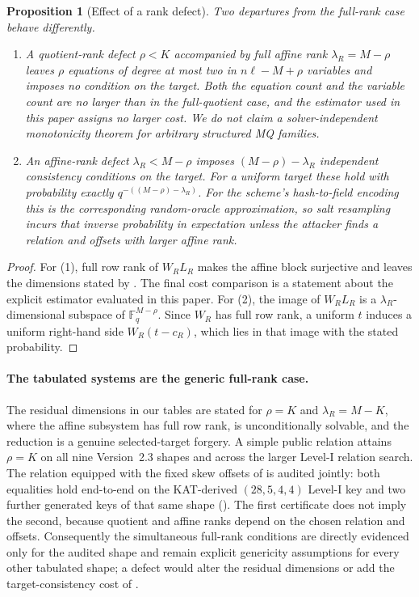 \documentclass[11pt]{article}
\newtheorem{proposition}[theorem]{Proposition}
\newcommand{\F}{\mathbb F}
\begin{document}
\begin{proposition}[Effect of a rank defect]
\label{prop:affine-rank}
Two departures from the full-rank case behave differently.
\begin{enumerate}
\item A \emph{quotient-rank} defect $\rho<K$ accompanied by full affine rank
$\lambda_R=M-\rho$ leaves $\rho$ equations of degree at most two in
$n\ell-M+\rho$ variables and imposes no condition on the target.  Both the
equation count and the variable count are no larger than in the full-quotient
case, and the estimator used in this paper assigns no larger cost.  We do not
claim a solver-independent monotonicity theorem for arbitrary structured MQ
families.
\item An \emph{affine-rank} defect $\lambda_R<M-\rho$ imposes
$(M-\rho)-\lambda_R$ independent consistency conditions on the target.  For a
uniform target these hold with probability exactly
$q^{-((M-\rho)-\lambda_R)}$.  For the scheme's hash-to-field encoding this is
the corresponding random-oracle approximation, so salt resampling incurs that
inverse probability in expectation unless the attacker finds a relation and
offsets with larger affine rank.
\end{enumerate}
\end{proposition}

\begin{proof}
For (1), full row rank of $W_RL_R$ makes the affine block surjective and leaves
the dimensions stated by .  The final cost comparison is a
statement about the explicit estimator evaluated in this paper.  For (2), the
image of $W_RL_R$ is a $\lambda_R$-dimensional subspace of
$\F_q^{M-\rho}$.  Since $W_R$ has full row rank, a uniform $t$ induces a
uniform right-hand side $W_R(t-c_R)$, which lies in that image with the stated
probability.
\end{proof}

\paragraph{The tabulated systems are the generic full-rank case.}
The residual dimensions in our tables are stated for $\rho=K$ and $\lambda_R=M-K$, where the affine subsystem has full row rank,  is unconditionally solvable, and the reduction is a genuine selected-target forgery.  A simple public relation attains $\rho=K$ on all nine Version~2.3 shapes and across the larger Level-I relation search.  The relation equipped with the fixed skew offsets of  is audited jointly: both equalities hold end-to-end on the KAT-derived $(28,5,4,4)$ Level-I key and two further generated keys of that same shape ().  The first certificate does not imply the second, because quotient and affine ranks depend on the chosen relation and offsets.  Consequently the simultaneous full-rank conditions are directly evidenced only for the audited shape and remain explicit genericity assumptions for every other tabulated shape; a defect would alter the residual dimensions or add the target-consistency cost of .
\end{document}
